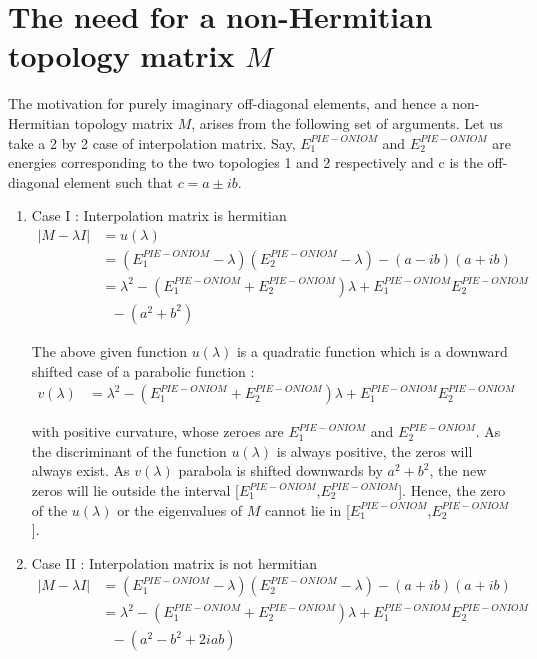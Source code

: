 \chapter{The need for a non-Hermitian topology matrix $M$}

The motivation for purely imaginary off-diagonal elements, and hence a non-Hermitian
topology matrix $M$, arises from the following
set of arguments. Let us take a 2 by 2 case of interpolation matrix.
Say, $E^{PIE-ONIOM}_1$ and $E^{PIE-ONIOM}_2$ are energies corresponding to the two
topologies 1 and 2 respectively and c is the off-diagonal element such that
$c = a \pm ib$.

\begin{enumerate}
\item Case I : Interpolation matrix is hermitian
\begin{equation}\label{eq2}
\left.\begin{aligned}
|M-\lambda I| &     =  u(\lambda)\\
              &     =  (E^{PIE-ONIOM}_1-\lambda)(E^{PIE-ONIOM}_2-\lambda) - (a-ib)(a+ib)\\
              &     =  \lambda^2 -(E^{PIE-ONIOM}_1 + E^{PIE-ONIOM}_2)\lambda + E^{PIE-ONIOM}_1E^{PIE-ONIOM}_2\\
              &~~~  - (a^2+b^2)
\end{aligned}\right.
\end{equation}

The above given function $u(\lambda)$ is a quadratic function which is a downward shifted
case of a parabolic function :
\begin{equation}\label{eq3}
\left.\begin{aligned}
v(\lambda) &     =  \lambda^2 -(E^{PIE-ONIOM}_1 + E^{PIE-ONIOM}_2)\lambda + E^{PIE-ONIOM}_1E^{PIE-ONIOM}_2
\end{aligned}\right.
\end{equation}

with positive curvature,
whose zeroes are $E^{PIE-ONIOM}_1$ and $E^{PIE-ONIOM}_2$. As the discriminant of the function
$u(\lambda)$ is always positive, the zeros will always exist. As $v(\lambda)$ parabola is
shifted downwards by $a^2+b^2$, the new zeros will lie outside the interval
[$E^{PIE-ONIOM}_1$,$E^{PIE-ONIOM}_2$]. Hence, the zero of the $u(\lambda)$ or the eigenvalues of $M$
cannot lie in [$E^{PIE-ONIOM}_1$,$E^{PIE-ONIOM}_2$].

\item Case II : Interpolation matrix is not hermitian
\begin{equation}\label{eq4}
\left.\begin{aligned}
|M-\lambda I| &     =  (E^{PIE-ONIOM}_1-\lambda)(E^{PIE-ONIOM}_2-\lambda) - (a+ib)(a+ib)\\
              &     =  \lambda^2 -(E^{PIE-ONIOM}_1 + E^{PIE-ONIOM}_2)\lambda + E^{PIE-ONIOM}_1E^{PIE-ONIOM}_2\\
              &     ~~~- (a^2-b^2+2iab)
\end{aligned}\right.
\end{equation}


\end{enumerate}
